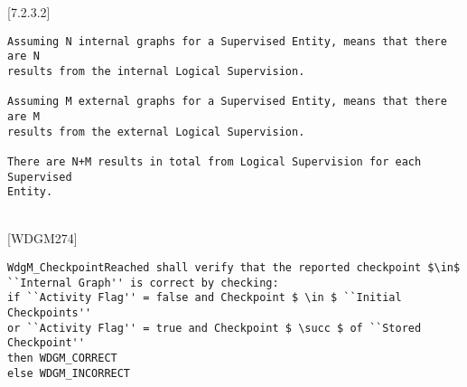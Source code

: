 \documentclass[11pt,a4paper]{article}
\begin{document}
[7.2.3.2]
\begin{lstlisting}
Assuming N internal graphs for a Supervised Entity, means that there are N
results from the internal Logical Supervision.

Assuming M external graphs for a Supervised Entity, means that there are M
results from the external Logical Supervision.

There are N+M results in total from Logical Supervision for each Supervised
Entity.
\end{lstlisting}~\\

[WDGM274]
\begin{lstlisting}[mathescape]
WdgM_CheckpointReached shall verify that the reported checkpoint $\in$
``Internal Graph'' is correct by checking:
if ``Activity Flag'' = false and Checkpoint $ \in $ ``Initial Checkpoints''
or ``Activity Flag'' = true and Checkpoint $ \succ $ of ``Stored Checkpoint''
then WDGM_CORRECT
else WDGM_INCORRECT
\end{lstlisting}~\\

\lstset{language=c}
\end{document}
